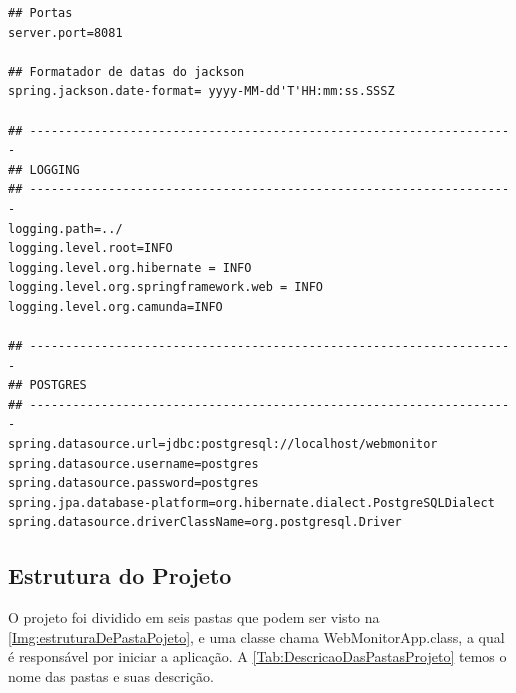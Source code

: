 \begin{lstlisting}[style=LIVRE, label=Func:applicationProperties,caption={[Arquivo application.properties com as principais configurações do projeto.]Arquivo application.properties com as principais configurações do projeto.}]
## Portas
server.port=8081

## Formatador de datas do jackson
spring.jackson.date-format= yyyy-MM-dd'T'HH:mm:ss.SSSZ

## --------------------------------------------------------------------
## LOGGING
## --------------------------------------------------------------------
logging.path=../
logging.level.root=INFO
logging.level.org.hibernate = INFO
logging.level.org.springframework.web = INFO
logging.level.org.camunda=INFO

## --------------------------------------------------------------------
## POSTGRES
## --------------------------------------------------------------------
spring.datasource.url=jdbc:postgresql://localhost/webmonitor
spring.datasource.username=postgres
spring.datasource.password=postgres
spring.jpa.database-platform=org.hibernate.dialect.PostgreSQLDialect
spring.datasource.driverClassName=org.postgresql.Driver

\end{lstlisting}




\subsection{Estrutura do Projeto}\label{subsec:EstruturaDoProjeto}

O projeto foi dividido em seis pastas que podem ser visto na \autoref{Img:estruturaDePastaPojeto}, e uma classe chama WebMonitorApp.class, a qual é responsável por iniciar a aplicação. A \autoref{Tab:DescricaoDasPastasProjeto} temos o nome das pastas e suas descrição.



